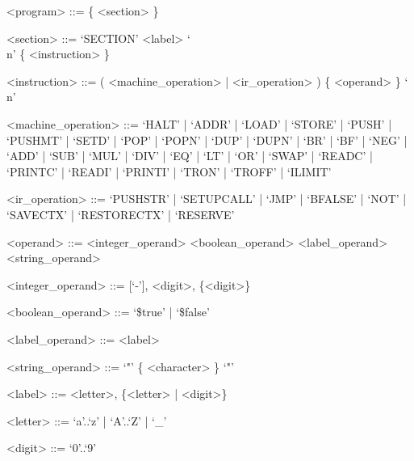 \documentclass[oneside]{amsart}
\theoremstyle{definition}
\theoremstyle{remark}
\numberwithin{equation}{section}
\begin{document}
\setlength{\grammarindent}{12em}
\begin{grammar}
<program>           ::= \{ <section> \}

<section>           ::= `SECTION' <label> `\\n'
\alt                  \{ <instruction> \}

<instruction>       ::= ( <machine_operation> | <ir_operation> )  \{ <operand> \} `\\n'

<machine_operation> ::= `HALT' | `ADDR' | `LOAD' | `STORE' | `PUSH' | `PUSHMT' | `SETD' | `POP' | `POPN' | `DUP' | `DUPN' | `BR' | `BF' | `NEG' | `ADD' | `SUB' | `MUL' | `DIV' | `EQ' | `LT' | `OR' | `SWAP' | `READC' | `PRINTC' | `READI' | `PRINTI' | `TRON' | `TROFF' | `ILIMIT'

<ir_operation>      ::= `PUSHSTR' | `SETUPCALL' | `JMP' | `BFALSE' | `NOT' | `SAVECTX' | `RESTORECTX' | `RESERVE'

<operand>           ::= <integer_operand>
\alt                    <boolean_operand>
\alt                    <label_operand>
\alt                    <string_operand>

<integer_operand>   ::= [`-'], <digit>, \{<digit>\}

<boolean_operand>   ::= `\$true' | `\$false'

<label_operand>     ::= <label>

<string_operand>    ::= `"' \{ <character> \} `"'

<label>             ::= <letter>, \{<letter> | <digit>\}

<letter>            ::= `a'..`z' | `A'..`Z' | `_'

<digit>             ::= `0'..`9'
\end{grammar}

\section{}


\end{document}

